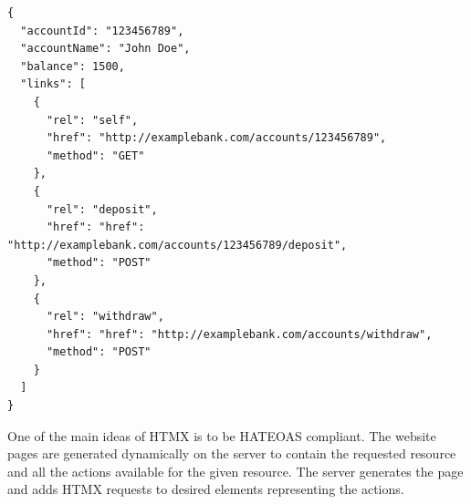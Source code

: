\begin{lstlisting}[caption=An HATEOAS response in JSON format,label=lst:hateoas, H]
{
  "accountId": "123456789",
  "accountName": "John Doe",
  "balance": 1500,
  "links": [
    {
      "rel": "self",
      "href": "http://examplebank.com/accounts/123456789",
      "method": "GET"
    },
    {
      "rel": "deposit",
      "href": "href": "http://examplebank.com/accounts/123456789/deposit",
      "method": "POST"
    },
    {
      "rel": "withdraw",
      "href": "href": "http://examplebank.com/accounts/withdraw",
      "method": "POST"
    }
  ]
}
\end{lstlisting}

One of the main ideas of HTMX is to be HATEOAS compliant. The website pages are generated dynamically on the server to contain the requested resource and all the actions available for the given resource. The server generates the page and adds HTMX requests to desired elements representing the actions.